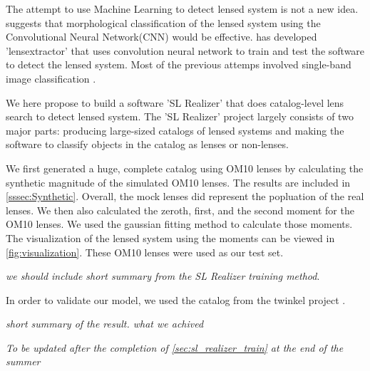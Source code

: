 \documentclass[\docopts]{\docclass}
\begin{document}
The attempt to use Machine Learning to detect lensed system is not a new idea. \citep{convolution_neural_network} suggests that morphological classification of the lensed system using the Convolutional Neural Network(CNN) would be effective. \citep{LensExtractor} has developed 'lensextractor' that uses convolution neural network to train and test the software to detect the lensed system. Most of the previous attemps involved single-band image classification \cite{LensExtractor} \cite{convolution_neural_network}.

We here propose to build a software 'SL Realizer' that does catalog-level lens search to detect lensed system. The 'SL Realizer' project largely consists of two major parts: producing large-sized catalogs of lensed systems and making the software to classify objects in the catalog as lenses or non-lenses. 

We first generated a huge, complete catalog using OM10 lenses \citep{OM10} by calculating the synthetic magnitude of the simulated OM10 lenses. The results are included in \ref{sssec:Synthetic}. Overall, the mock lenses did represent the popluation of the real lenses. We then also calculated the zeroth, first, and the second moment for the OM10 lenses. We used the gaussian fitting method to calculate those moments. The visualization of the lensed system using the moments can be viewed in \ref{fig:visualization}. These OM10 lenses were used as our test set.

\textit{we should include short summary from the SL Realizer training method}.

In order to validate our model, we used the catalog from the twinkel project \cite{Twinkles}.

\textit{short summary of the result. what we achived}
 
\textit{To be updated after the completion of \ref{sec:sl_realizer_train} at the end of the summer}



\end{document}
